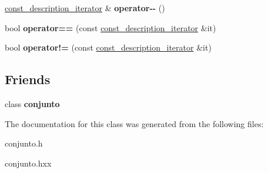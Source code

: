 \begin{DoxyCompactItemize}
\item 
\hypertarget{classconjunto_1_1const__description__iterator_acec2d24c261a519f33d062d382c3d6f8}{}\hyperlink{classconjunto_1_1const__description__iterator}{const\+\_\+description\+\_\+iterator} \& {\bfseries operator-\/-\/} ()\label{classconjunto_1_1const__description__iterator_acec2d24c261a519f33d062d382c3d6f8}

\item 
\hypertarget{classconjunto_1_1const__description__iterator_a10b1ae1aef96a8c424ca65578c18993f}{}bool {\bfseries operator==} (const \hyperlink{classconjunto_1_1const__description__iterator}{const\+\_\+description\+\_\+iterator} \&it)\label{classconjunto_1_1const__description__iterator_a10b1ae1aef96a8c424ca65578c18993f}

\item 
\hypertarget{classconjunto_1_1const__description__iterator_ab6edb507aa74528f97a579df5ebb210f}{}bool {\bfseries operator!=} (const \hyperlink{classconjunto_1_1const__description__iterator}{const\+\_\+description\+\_\+iterator} \&it)\label{classconjunto_1_1const__description__iterator_ab6edb507aa74528f97a579df5ebb210f}

\end{DoxyCompactItemize}
\subsection*{Friends}
\begin{DoxyCompactItemize}
\item 
\hypertarget{classconjunto_1_1const__description__iterator_a42fdcda39c77eabd7380e29fcdbe5dd2}{}class {\bfseries conjunto}\label{classconjunto_1_1const__description__iterator_a42fdcda39c77eabd7380e29fcdbe5dd2}

\end{DoxyCompactItemize}


The documentation for this class was generated from the following files\+:\begin{DoxyCompactItemize}
\item 
conjunto.\+h\item 
conjunto.\+hxx\end{DoxyCompactItemize}

